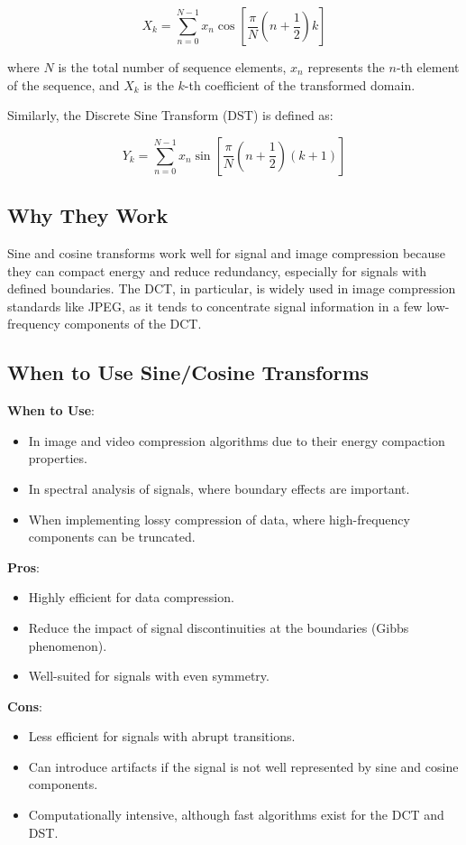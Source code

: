 \documentclass[12pt]{article}
\begin{document}
\[ X_k = \sum_{n=0}^{N-1} x_n \cos\left[\frac{\pi}{N}(n + \frac{1}{2})k\right] \]

where \( N \) is the total number of sequence elements, \( x_n \) represents the \( n \)-th element of the sequence, and \( X_k \) is the \( k \)-th coefficient of the transformed domain.

Similarly, the Discrete Sine Transform (DST) is defined as:

\[ Y_k = \sum_{n=0}^{N-1} x_n \sin\left[\frac{\pi}{N}(n + \frac{1}{2})(k + 1)\right] \]

\subsection{Why They Work}

Sine and cosine transforms work well for signal and image compression because they can compact energy and reduce redundancy, especially for signals with defined boundaries. The DCT, in particular, is widely used in image compression standards like JPEG, as it tends to concentrate signal information in a few low-frequency components of the DCT.

\subsection{When to Use Sine/Cosine Transforms}

\textbf{When to Use}:
\begin{itemize}
    \item In image and video compression algorithms due to their energy compaction properties.
    \item In spectral analysis of signals, where boundary effects are important.
    \item When implementing lossy compression of data, where high-frequency components can be truncated.
\end{itemize}

\textbf{Pros}:
\begin{itemize}
    \item Highly efficient for data compression.
    \item Reduce the impact of signal discontinuities at the boundaries (Gibbs phenomenon).
    \item Well-suited for signals with even symmetry.
\end{itemize}

\textbf{Cons}:
\begin{itemize}
    \item Less efficient for signals with abrupt transitions.
    \item Can introduce artifacts if the signal is not well represented by sine and cosine components.
    \item Computationally intensive, although fast algorithms exist for the DCT and DST.
\end{itemize}
\end{document}
